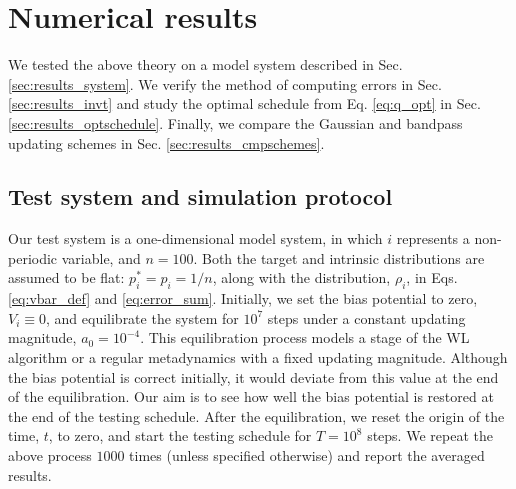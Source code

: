 \documentclass[reprint, superscriptaddress, floatfix]{revtex4-1}
\begin{document}
%
%




\section{\label{sec:results}
Numerical results}



We tested the above theory on a model system
described in Sec. \ref{sec:results_system}.
%
We verify the method of computing errors
in Sec. \ref{sec:results_invt}
%
and study the optimal schedule from
Eq. \eqref{eq:q_opt}
in Sec. \ref{sec:results_optschedule}.
%
Finally, we compare the Gaussian and
bandpass updating schemes %
in Sec. \ref{sec:results_cmpschemes}.



\subsection{\label{sec:results_system}
Test system and simulation protocol}



Our test system is a one-dimensional model system, in which
$i$ represents a non-periodic variable,
and $n = 100$.
%
Both the target and intrinsic distributions
are assumed to be flat:
$p^*_i = p_i = 1/n$,
along with the distribution, $\rho_i$, in Eqs.
\eqref{eq:vbar_def} and \eqref{eq:error_sum}.
%
%
Initially,
we set the bias potential to zero,
$V_i \equiv 0$,
and equilibrate the system for $10^7$ steps
under a constant updating magnitude,
$a_0 = 10^{-4}$.
%
This equilibration process models
a stage of the WL algorithm or
a regular metadynamics
with a fixed updating magnitude.
%
Although the bias potential is correct initially,
it would deviate from this value
at the end of the equilibration.
%
Our aim is to see how well
the bias potential is restored
at the end of the testing schedule.
%
After the equilibration,
we reset the origin of the time, $t$, to zero,
and start the testing schedule
for $T = 10^8$ steps.
%
We repeat the above process $1000$ times (unless specified otherwise)
and report the averaged results.
\end{document}
